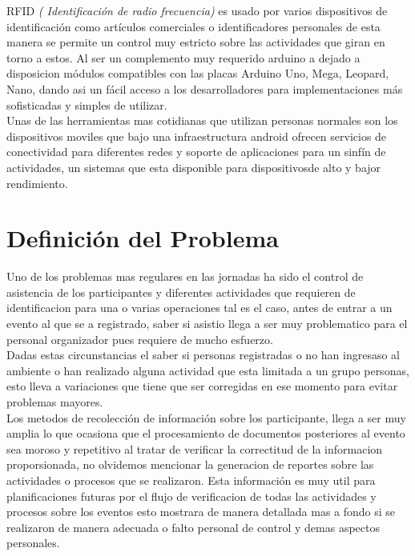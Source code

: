 \documentclass[letter,12pt]{article}
\begin{document}
RFID \textit{( Identificaci\'on de radio frecuencia)} es usado por varios dispositivos de identificaci\'on como art\'iculos comerciales o identificadores personales de esta manera se permite un control muy estricto sobre las actividades que giran en torno a estos. Al ser un complemento muy requerido arduino a dejado a disposicion m\'odulos compatibles con las placas Arduino Uno, Mega, Leopard, Nano, dando asi un f\'acil acceso a los desarrolladores para implementaciones m\'as sofisticadas y simples de utilizar.\\

Unas de las herramientas mas cotidianas que utilizan personas normales son los  dispositivos moviles que bajo una infraestructura android ofrecen servicios de conectividad para diferentes redes y soporte de aplicaciones para un sinf\'in de actividades, un sistemas que esta disponible para dispositivosde alto y bajor rendimiento.

 
\section{Definici\'on del Problema}

Uno de los problemas mas regulares en las jornadas ha sido el control de asistencia de los participantes y diferentes actividades que requieren de identificacion para una o varias operaciones tal es el caso, antes de entrar a un evento al que se a registrado, saber si asistio llega a ser muy problematico para el personal organizador pues requiere de mucho esfuerzo. \\

Dadas estas circunstancias el saber si personas registradas o no han ingresaso al ambiente o han realizado alguna actividad que esta limitada a un grupo personas, esto lleva a variaciones que tiene que ser corregidas en ese momento para evitar problemas mayores.\\

Los metodos de recolecci\'on de informaci\'on sobre los participante, llega a ser muy amplia lo que ocasiona que el procesamiento de documentos posteriores al evento sea moroso y repetitivo al tratar de verificar la correctitud de la informacion proporsionada, no olvidemos mencionar la generacion de reportes sobre las actividades o procesos que se realizaron. Esta informaci\'on es muy util para planificaciones futuras por el flujo de verificacion de todas las actividades y procesos sobre los eventos  esto mostrara de manera detallada mas a fondo si se realizaron de manera adecuada o falto personal de control y demas aspectos personales.
\end{document}
